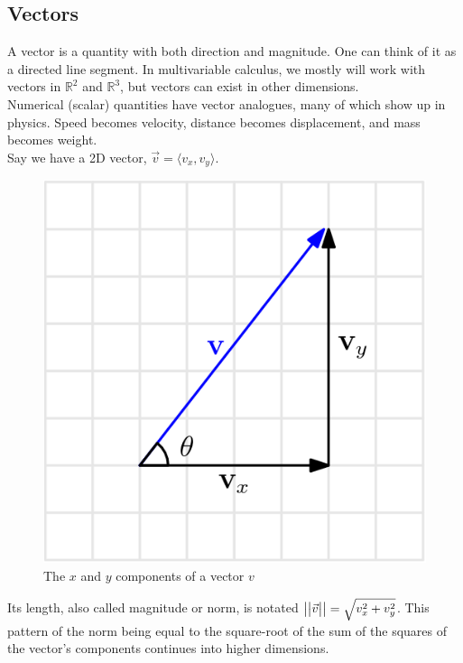 \subsection{Vectors}
\noindent
A vector is a quantity with both direction and magnitude.
One can think of it as a directed line segment.
In multivariable calculus, we mostly will work with vectors in $\mathbb{R}^2$ and $\mathbb{R}^3$, but vectors can exist in other dimensions.\\

\noindent
Numerical (scalar) quantities have vector analogues, many of which show up in physics.
Speed becomes velocity, distance becomes displacement, and mass becomes weight.\\

\noindent
Say we have a 2D vector, $\vec{v} = \langle v_x, v_y \rangle$.

\begin{figure}[H]
	\centering
	\includegraphics[scale=0.5]{../common/vectorsMatrices/VectorAddition.png}
	\caption{The $x$ and $y$ components of a vector $v$}
\end{figure}

\noindent
Its length, also called magnitude or norm, is notated $\big\lvert \big\lvert \vec{v} \big\rvert \big\rvert = \sqrt{v_x^2+v_y^2}$.
This pattern of the norm being equal to the square-root of the sum of the squares of the vector's components continues into higher dimensions.\\

